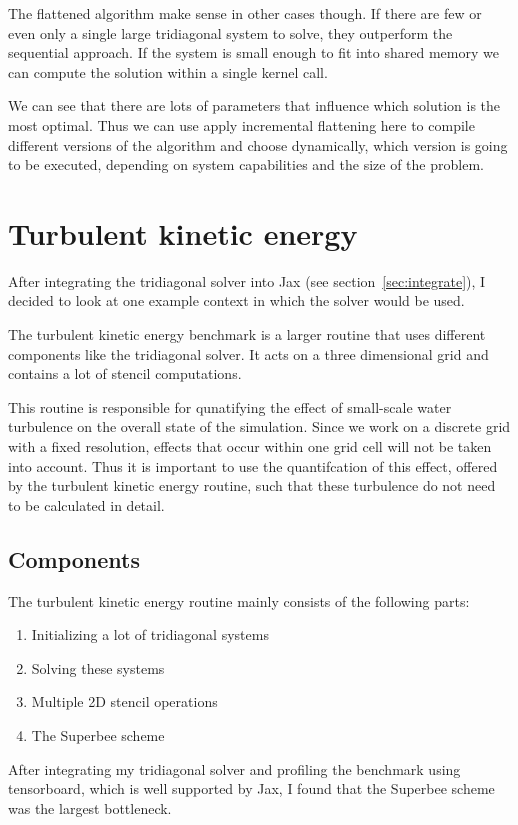 \documentclass[a4paper,oneside]{memoir}
\begin{document}
The flattened algorithm make sense in other cases though. If there are few or even only a single large tridiagonal system to solve, they outperform the sequential approach. If the system is small enough to fit into shared memory we can compute the solution within a single kernel call. 

We can see that there are lots of parameters that influence which solution is the most optimal. Thus we can use apply incremental flattening \cite{incremental} here to compile different versions of the algorithm and choose dynamically, which version is going to be executed, depending on system capabilities and the size of the problem.



\section{Turbulent kinetic energy}
After integrating the tridiagonal solver into Jax (see section~\ref{sec:integrate}), I decided to look at one example context in which the solver would be used.

The turbulent kinetic energy benchmark is a larger routine that uses different components like the tridiagonal solver. It acts on a three dimensional grid and contains a lot of stencil computations.

This routine is responsible for qunatifying the effect of small-scale water turbulence on the overall state of the simulation. Since we work on a discrete grid with a fixed resolution, effects that occur within one grid cell will not be taken into account. Thus it is important to use the quantifcation of this effect, offered by the turbulent kinetic energy routine, such that these turbulence do not need to be calculated in detail.

\subsection{Components}
The turbulent kinetic energy routine mainly consists of the following parts:
\begin{enumerate}
    \item Initializing a lot of tridiagonal systems
    \item Solving these systems 
    \item Multiple 2D stencil operations
    \item The Superbee scheme
\end{enumerate}
After integrating my tridiagonal solver and profiling the benchmark using tensorboard, which is well supported by Jax, I found that the Superbee scheme was the largest bottleneck.  
\end{document}
